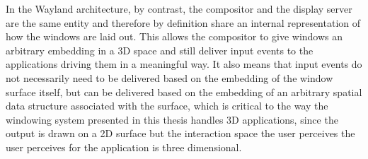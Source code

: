 In the Wayland architecture, by contrast, the compositor and the display server are the same entity and therefore by definition share an internal representation of how the windows are laid out. This allows the compositor to give windows an arbitrary embedding in a 3D space and still deliver input events to the applications driving them in a meaningful way. It also means that input events do not necessarily need to be delivered based on the embedding of the window surface itself, but can be delivered based on the embedding of an arbitrary spatial data structure associated with the surface, which is critical to the way the windowing system presented in this thesis handles 3D applications, since the output is drawn on a 2D surface but the interaction space the user perceives the user perceives for the application is three dimensional.



